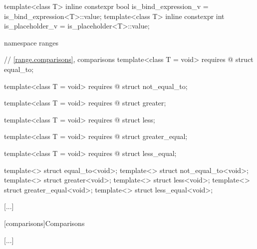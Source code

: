\begin{codeblock}
  [...]

  template<class T>
    inline constexpr bool is_bind_expression_v = is_bind_expression<T>::value;
  template<class T>
    inline constexpr int is_placeholder_v = is_placeholder<T>::value;
\end{codeblock}
\begin{addedblock}
\begin{codeblock}

  namespace ranges {
    // \ref{range.comparisons}, comparisons
    template<class T = void>
      requires @\seebelow@
    struct equal_to;

    template<class T = void>
      requires @\seebelow@
    struct not_equal_to;

    template<class T = void>
      requires @\seebelow@
    struct greater;

    template<class T = void>
      requires @\seebelow@
    struct less;

    template<class T = void>
      requires @\seebelow@
    struct greater_equal;

    template<class T = void>
      requires @\seebelow@
    struct less_equal;

    template<> struct equal_to<void>;
    template<> struct not_equal_to<void>;
    template<> struct greater<void>;
    template<> struct less<void>;
    template<> struct greater_equal<void>;
    template<> struct less_equal<void>;
  }
\end{codeblock}
\end{addedblock}
\begin{codeblock}
}
\end{codeblock}

[...]

\setcounter{subsection}{6}
[comparisons]{Comparisons}

[...]

